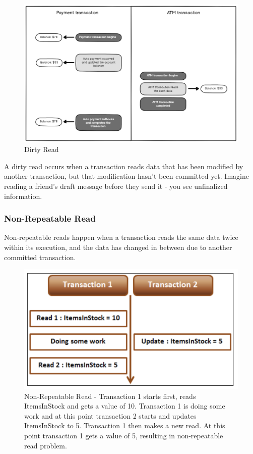 \begin{figure}[H]
  \includegraphics[width=\linewidth]{images/chapter-jdbc/dirty_read.png}
  \caption{Dirty Read}
  \label{fig:paths}
\end{figure}

A dirty read occurs when a transaction reads data that has been modified by another transaction, but that modification hasn't been committed yet. Imagine reading a friend's draft message before they send it - you see unfinalized information.

\subsubsection{Non-Repeatable Read}

Non-repeatable reads happen when a transaction reads the same data twice within its execution, and the data has changed in between due to another committed transaction. 

\begin{figure}[H]
  \includegraphics[width=\linewidth]{images/chapter-jdbc/non_repeatable_read.png}
  \caption{Non-Repeatable Read - Transaction 1 starts first,  reads ItemsInStock and gets a value of 10. Transaction 1 is doing some work and at this point transaction 2 starts and updates ItemsInStock to 5. Transaction 1 then makes a new read. At this point transaction 1 gets a value of 5,  resulting in non-repeatable read problem. }
  \label{fig:paths}
\end{figure}


